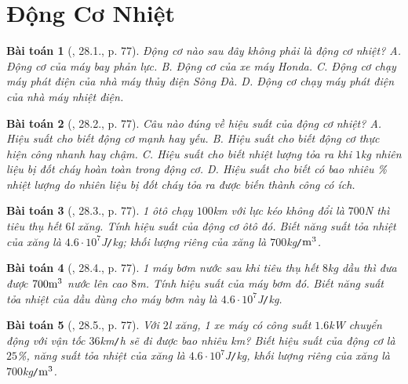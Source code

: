 \documentclass{article}
\newtheorem{baitoan}{Bài toán}
\begin{document}

\section{Động Cơ Nhiệt}

\begin{baitoan}[\cite{SBT_Vat_Ly_8}, 28.1., p. 77]
	Động cơ nào sau đây không phải là động cơ nhiệt? {\sf A.} Động cơ của máy bay phản lực. {\sf B.} Động cơ của xe máy Honda. {\sf C.} Động cơ chạy máy phát điện của nhà máy thủy điện Sông Đà. {\sf D.} Động cơ chạy máy phát điện của nhà máy nhiệt điện.
\end{baitoan}

\begin{baitoan}[\cite{SBT_Vat_Ly_8}, 28.2., p. 77]
	Câu nào đúng về hiệu suất của động cơ nhiệt? {\sf A.} Hiệu suất cho biết động cơ mạnh hay yếu. {\sf B.} Hiệu suất cho biết động cơ thực hiện công nhanh hay chậm. {\sf C.} Hiệu suất cho biết nhiệt lượng tỏa ra khi $1$\emph{kg} nhiên liệu bị đốt cháy hoàn toàn trong động cơ. {\sf D.} Hiệu suất cho biết có bao nhiêu \% nhiệt lượng do nhiên liệu bị đốt cháy tỏa ra được biến thành công có ích.
\end{baitoan}

\begin{baitoan}[\cite{SBT_Vat_Ly_8}, 28.3., p. 77]
	1 ôtô chạy $100$\emph{km} với lực kéo không đổi là $700$\emph{N} thì tiêu thụ hết $6$\emph{l} xăng. Tính hiệu suất của động cơ ôtô đó. Biết năng suất tỏa nhiệt của xăng là $4.6\cdot10^7$\emph{J\texttt{/}kg}; khối lượng riêng của xăng là $700$\emph{kg\texttt{/}$\rm m^3$}.
\end{baitoan}

\begin{baitoan}[\cite{SBT_Vat_Ly_8}, 28.4., p. 77]
	1 máy bơm nước sau khi tiêu thụ hết $8$\emph{kg} dầu thì đưa được $700\rm m^3$ nước lên cao $8$\emph{m}. Tính hiệu suất của máy bơm đó. Biết năng suất tỏa nhiệt của dầu dùng cho máy bơm này là  $4.6\cdot10^7$\emph{J\texttt{/}kg}.
\end{baitoan}

\begin{baitoan}[\cite{SBT_Vat_Ly_8}, 28.5., p. 77]
	Với $2$\emph{l} xăng, 1 xe máy có công suất $1.6$\emph{kW} chuyển động với vận tốc $36$\emph{km\texttt{/}h} sẽ đi được bao nhiêu \emph{km}? Biết hiệu suất của động cơ là $25$\%, năng suất tỏa nhiệt của xăng là $4.6\cdot10^7$\emph{J\texttt{/}kg}, khối lượng riêng của xăng là $700$\emph{kg\texttt{/}$\rm m^3$}.
\end{baitoan}
\end{document}
